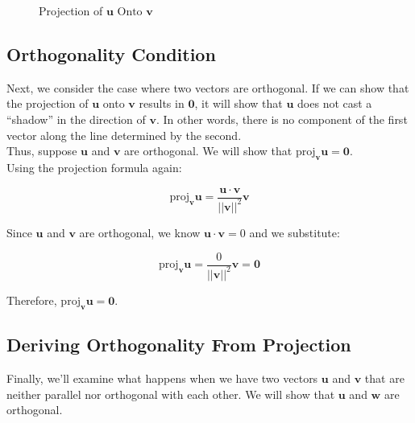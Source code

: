 \documentclass{article}
\newcommand{\mbf}[1]{\mathbf{#1}}
\begin{document}
\begin{figure}[htb]
    \label{fig1}
    \centering
    \caption{Projection of \(\mbf{u} \text{ Onto } \mbf{v}\)}
\end{figure}
\newpage
\subsection{Orthogonality Condition}
Next, we consider the case where two vectors are orthogonal. If we can show that the projection of \(\mbf{u}\) onto \(\mbf{v}\) results in \(\mbf{0}\), it will show that \(\mbf{u}\) does not cast a ``shadow'' in the direction of \(\mbf{v}\). In other words, there is no component of the first vector along the line determined by the second. \\

Thus, suppose \(\mbf{u}\) and \(\mbf{v}\) are orthogonal. We will show that \(\text{proj}_{\mbf{v}} \mbf{u} = \mbf{0}\). \\

Using the projection formula again:

\[
\text{proj}_{\mbf{v}} \mbf{u} = \frac{\mbf{u} \cdot \mbf{v}}{||\mbf{v}||^2} \mbf{v}
\]

Since \(\mbf{u}\) and \(\mbf{v}\) are orthogonal, we know \(\mbf{u} \cdot \mbf{v} = 0\) and we substitute:

\[
\text{proj}_{\mbf{v}} \mbf{u} = \frac{0}{||\mbf{v}||^2} \mbf{v} = \mbf{0}
\]

Therefore, \(\text{proj}_{\mbf{v}} \mbf{u} = \mbf{0}\). 

\subsection{Deriving Orthogonality From Projection}
Finally, we'll examine what happens when we have two vectors \(\mbf{u}\) and \(\mbf{v}\) that are neither parallel nor orthogonal with each other. We will show that \(\mbf{u}\) and \(\mbf{w}\) are orthogonal. \\ 
\end{document}
